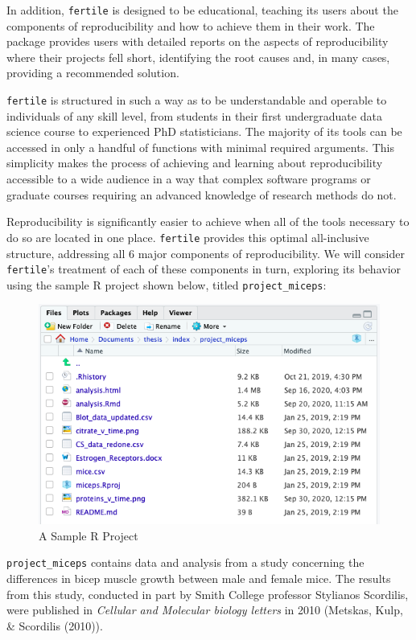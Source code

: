 \documentclass[12pt,twoside]{reedthesis}
\begin{document}
In addition, \texttt{fertile} is designed to be educational, teaching its users about the components of reproducibility and how to achieve them in their work. The package provides users with detailed reports on the aspects of reproducibility where their projects fell short, identifying the root causes and, in many cases, providing a recommended solution.

\texttt{fertile} is structured in such a way as to be understandable and operable to individuals of any skill level, from students in their first undergraduate data science course to experienced PhD statisticians. The majority of its tools can be accessed in only a handful of functions with minimal required arguments. This simplicity makes the process of achieving and learning about reproducibility accessible to a wide audience in a way that complex software programs or graduate courses requiring an advanced knowledge of research methods do not.

Reproducibility is significantly easier to achieve when all of the tools necessary to do so are located in one place. \texttt{fertile} provides this optimal all-inclusive structure, addressing all 6 major components of reproducibility. We will consider \texttt{fertile}'s treatment of each of these components in turn, exploring its behavior using the sample R project shown below, titled \texttt{project\_miceps}:
\begin{figure}
\includegraphics[width=1\linewidth]{figure/sample-project} \caption{A Sample R Project}\label{fig:unnamed-chunk-9}
\end{figure}
\texttt{project\_miceps} contains data and analysis from a study concerning the differences in bicep muscle growth between male and female mice. The results from this study, conducted in part by Smith College professor Stylianos Scordilis, were published in \emph{Cellular and Molecular biology letters} in 2010 (Metskas, Kulp, \& Scordilis (2010)).
\end{document}
